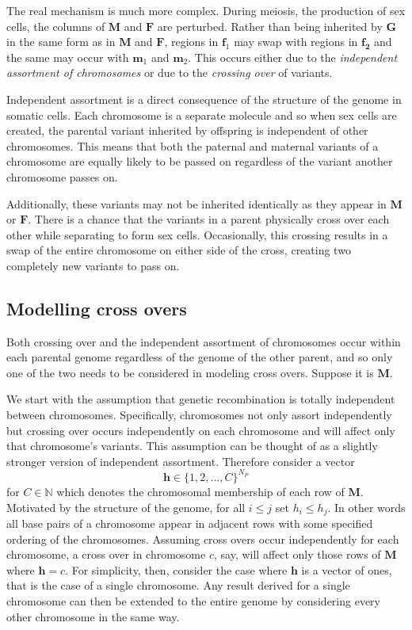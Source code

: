\documentclass{article}
\newcommand{\ve}[1]{\mathbf{#1}}           %
\newcommand{\m}[1]{\mathbf{#1}}               %
\newcommand{\field}[1]{\mathbb{#1}}
\newcommand{\Naturals}{\field{N}}
\begin{document}
The real mechanism is much more complex. During meiosis, the production of sex cells, the columns of $\m{M}$ and $\m{F}$ are perturbed. Rather than being inherited by $\m{G}$ in the same form as in $\m{M}$ and $\m{F}$, regions in $\ve{f}_1$ may swap with regions in $\ve{f_2}$ and the same may occur with $\ve{m}_1$ and $\ve{m}_2$. This occurs either due to the \emph{independent assortment of chromosomes} or due to the \emph{crossing over} of variants.

Independent assortment is a direct consequence of the structure of the genome in somatic cells. Each chromosome is a separate molecule and so when sex cells are created, the parental variant inherited by offspring is independent of other chromosomes. This means that both the paternal and maternal variants of a chromosome are equally likely to be passed on regardless of the variant another chromosome passes on.

Additionally, these variants may not be inherited identically as they appear in $\m{M}$ or $\m{F}$. There is a chance that the variants in a parent physically cross over each other while separating to form sex cells. Occasionally, this crossing results in a swap of the entire chromosome on either side of the cross, creating two completely new variants to pass on.

\subsection{Modelling cross overs} \label{subsec:modelcrossing}

Both crossing over and the independent assortment of chromosomes occur within each parental genome regardless of the genome of the other parent, and so only one of the two needs to be considered in modeling cross overs. Suppose it is $\m{M}$.

We start with the assumption that genetic recombination is totally independent between chromosomes. Specifically, chromosomes not only assort independently but crossing over occurs independently on each chromosome and will affect only that chromosome's variants. This assumption can be thought of as a slightly stronger version of independent assortment. Therefore consider a vector
$$\ve{h} \in \{1, 2, \dots, C\}^{N_P}$$
for $C \in \Naturals$ which denotes the chromosomal membership of each row of $\m{M}$. Motivated by the structure of the genome, for all $i \leq j$ set $h_i \leq h_j$. In other words all base pairs of a chromosome appear in adjacent rows with some specified ordering of the chromosomes. Assuming cross overs occur independently for each chromosome, a cross over in chromosome $c$, say, will affect only those rows of $\m{M}$ where $\ve{h} = c$. For simplicity, then, consider the case where $\ve{h}$ is a vector of ones, that is the case of a single chromosome. Any result derived for a single chromosome can then be extended to the entire genome by considering every other chromosome in the same way.
\end{document}

